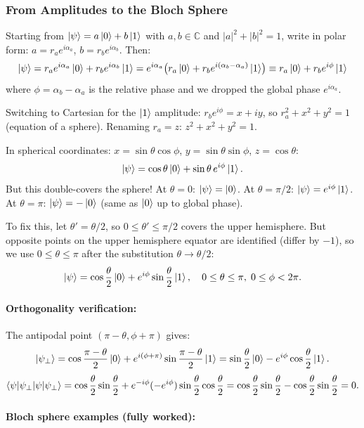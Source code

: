 \documentclass[10pt,a4paper]{article}
\begin{document}
\subsubsection*{From Amplitudes to the Bloch Sphere}

Starting from $\ket{\psi}=a\ket{0}+b\ket{1}$ with $a,b\in\mathbb{C}$ and $|a|^2+|b|^2=1$, write in polar form: $a=r_ae^{i\alpha_a}$, $b=r_be^{i\alpha_b}$. Then:
\[
\ket{\psi}=r_ae^{i\alpha_a}\ket{0}+r_be^{i\alpha_b}\ket{1}=e^{i\alpha_a}\bigl(r_a\ket{0}+r_be^{i(\alpha_b-\alpha_a)}\ket{1}\bigr)\equiv r_a\ket{0}+r_be^{i\phi}\ket{1}
\]
where $\phi=\alpha_b-\alpha_a$ is the relative phase and we dropped the global phase $e^{i\alpha_a}$.

Switching to Cartesian for the $\ket{1}$ amplitude: $r_be^{i\phi}=x+iy$, so $r_a^2+x^2+y^2=1$ (equation of a sphere). Renaming $r_a=z$: $z^2+x^2+y^2=1$.

In spherical coordinates: $x=\sin\theta\cos\phi$, $y=\sin\theta\sin\phi$, $z=\cos\theta$:
\[
\ket{\psi}=\cos\theta\ket{0}+\sin\theta\,e^{i\phi}\ket{1}.
\]
But this double-covers the sphere! At $\theta=0$: $\ket{\psi}=\ket{0}$. At $\theta=\pi/2$: $\ket{\psi}=e^{i\phi}\ket{1}$. At $\theta=\pi$: $\ket{\psi}=-\ket{0}$ (same as $\ket{0}$ up to global phase).

To fix this, let $\theta'=\theta/2$, so $0\le\theta'\le\pi/2$ covers the upper hemisphere. But opposite points on the upper hemisphere equator are identified (differ by $-1$), so we use $0\le\theta\le\pi$ after the substitution $\theta\to\theta/2$:
\[
\ket{\psi}=\cos\frac{\theta}{2}\ket{0}+e^{i\phi}\sin\frac{\theta}{2}\ket{1},\quad 0\le\theta\le\pi,\; 0\le\phi<2\pi.
\]

\paragraph{Orthogonality verification:} The antipodal point $(\pi-\theta,\phi+\pi)$ gives:
\[
\ket{\psi_\perp}=\cos\frac{\pi-\theta}{2}\ket{0}+e^{i(\phi+\pi)}\sin\frac{\pi-\theta}{2}\ket{1}=\sin\frac{\theta}{2}\ket{0}-e^{i\phi}\cos\frac{\theta}{2}\ket{1}.
\]
\[
\braket{\psi|\psi_\perp}=\cos\frac{\theta}{2}\sin\frac{\theta}{2}+e^{-i\phi}(-e^{i\phi})\sin\frac{\theta}{2}\cos\frac{\theta}{2}=\cos\frac{\theta}{2}\sin\frac{\theta}{2}-\cos\frac{\theta}{2}\sin\frac{\theta}{2}=0.
\]

\paragraph{Bloch sphere examples (fully worked):}
\end{document}
